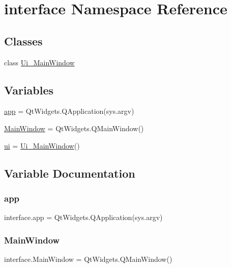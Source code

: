 \hypertarget{namespaceinterface}{}\section{interface Namespace Reference}
\label{namespaceinterface}
\subsection*{Classes}
\begin{DoxyCompactItemize}
\item 
class \hyperlink{classinterface_1_1_ui___main_window}{Ui\+\_\+\+Main\+Window}
\end{DoxyCompactItemize}
\subsection*{Variables}
\begin{DoxyCompactItemize}
\item 
\hyperlink{namespaceinterface_acece825df764f646248f5f5140d16d58}{app} = Qt\+Widgets.\+Q\+Application(sys.\+argv)
\item 
\hyperlink{namespaceinterface_a2992487bd5cfe196771a900a60d65114}{Main\+Window} = Qt\+Widgets.\+Q\+Main\+Window()
\item 
\hyperlink{namespaceinterface_aab512714b28c117f490382c476c33821}{ui} = \hyperlink{classinterface_1_1_ui___main_window}{Ui\+\_\+\+Main\+Window}()
\end{DoxyCompactItemize}


\subsection{Variable Documentation}
\mbox{\label{namespaceinterface_acece825df764f646248f5f5140d16d58}} 
\subsubsection{\texorpdfstring{app}{app}}
{\footnotesize\ttfamily interface.\+app = Qt\+Widgets.\+Q\+Application(sys.\+argv)}

\mbox{\label{namespaceinterface_a2992487bd5cfe196771a900a60d65114}} 
\subsubsection{\texorpdfstring{Main\+Window}{MainWindow}}
{\footnotesize\ttfamily interface.\+Main\+Window = Qt\+Widgets.\+Q\+Main\+Window()}

